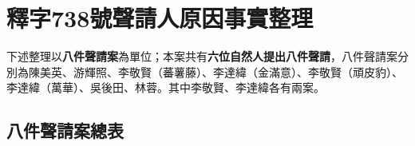 
\appendix

\section{釋字738號聲請人原因事實整理}

下述整理以\textbf{八件聲請案}為單位；本案共有\textbf{六位自然人提出八件聲請}，八件聲請案分別為陳美英、游輝照、李敬賢（蕃薯藤）、李達緯（金滿意）、李敬賢（頑皮豹）、李達緯（萬華）、吳後田、林蓉。其中李敬賢、李達緯各有兩案。




\subsection{八件聲請案總表}

